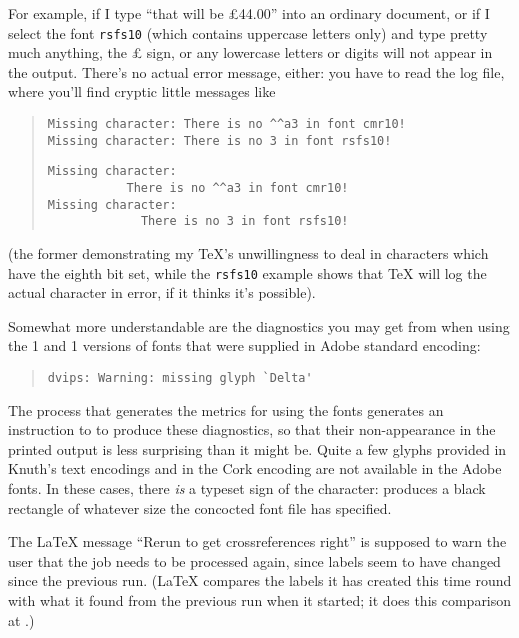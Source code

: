 For example, if I type ``that will be \pounds{}44.00'' into an ordinary
\AllTeX{} document, or if I select the font \texttt{rsfs10} (which contains
uppercase letters only) and type pretty much anything, the \pounds{}
sign, or any lowercase letters or digits will not appear in the
output.  There's no actual error message, either: you have to read the
log file, where you'll find cryptic little messages like
\begin{quote}
\begin{wideversion}
\begin{verbatim}
Missing character: There is no ^^a3 in font cmr10!
Missing character: There is no 3 in font rsfs10!
\end{verbatim} 
\end{wideversion}
\begin{narrowversion}
\begin{verbatim}
Missing character:
           There is no ^^a3 in font cmr10!
Missing character:
             There is no 3 in font rsfs10!
\end{verbatim} 
\end{narrowversion}
\end{quote}
(the former demonstrating my \TeX{}'s unwillingness to deal in characters
which have the eighth bit set, while the \texttt{rsfs10} example shows that
\TeX{} will log the actual character in error, if it thinks it's
possible).

Somewhat more understandable are the diagnostics you may get from
 when using the 1 and 1 versions of
fonts that were supplied in Adobe standard encoding:
\begin{quote}
\begin{verbatim}
dvips: Warning: missing glyph `Delta'
\end{verbatim}
\end{quote}
The process that generates the metrics for using the fonts generates
an instruction to  to produce these diagnostics, so
that their non-appearance in the printed output is less surprising
than it might be.  Quite a few glyphs provided in Knuth's text
encodings and in the Cork encoding are not available in the Adobe
fonts.  In these cases, there \emph{is} a typeset sign of the
character:  produces a black rectangle of whatever
size the concocted font file has specified.


The \LaTeX{} message ``Rerun to get crossreferences right'' is
supposed to warn the user that the job needs to be processed again,
since labels seem to have changed since the previous run.  (\LaTeX{}
compares the labels it has created this time round with what it found
from the previous run when it started; it does this comparison at
.)


